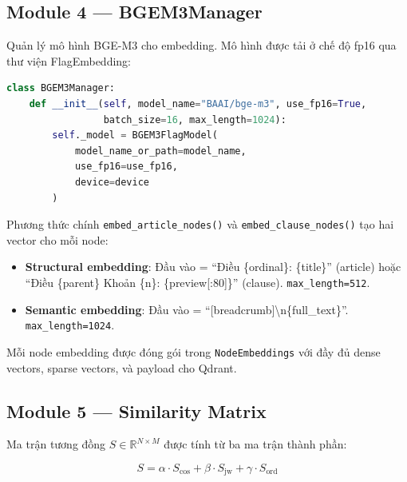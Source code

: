 \subsection{Module 4 — BGEM3Manager}

Quản lý mô hình BGE-M3 \cite{chen2024bge} cho embedding. Mô hình được tải ở chế độ \gls{fp16} qua thư viện FlagEmbedding:

\begin{lstlisting}[language=Python, caption={Khởi tạo BGE-M3 Manager với dual embedding}, label={lst:bge_m3}]
class BGEM3Manager:
    def __init__(self, model_name="BAAI/bge-m3", use_fp16=True,
                 batch_size=16, max_length=1024):
        self._model = BGEM3FlagModel(
            model_name_or_path=model_name,
            use_fp16=use_fp16,
            device=device
        )
\end{lstlisting}

Phương thức chính \texttt{embed\_article\_nodes()} và \texttt{embed\_clause\_nodes()} tạo hai vector cho mỗi node:

\begin{itemize}
    \item \textbf{Structural embedding}: Đầu vào = ``Điều \{ordinal\}: \{title\}'' (article) hoặc ``Điều \{parent\} Khoản \{n\}: \{preview[:80]\}'' (clause). \texttt{max\_length=512}.
    \item \textbf{Semantic embedding}: Đầu vào = ``[breadcrumb]\textbackslash n\{full\_text\}''. \texttt{max\_length=1024}.
\end{itemize}

Mỗi node embedding được đóng gói trong \texttt{NodeEmbeddings} với đầy đủ dense vectors, sparse vectors, và payload cho Qdrant.

\subsection{Module 5 — Similarity Matrix}

Ma trận tương đồng $S \in \mathbb{R}^{N \times M}$ được tính từ ba ma trận thành phần:

\begin{equation}
    S = \alpha \cdot S_{\text{cos}} + \beta \cdot S_{\text{jw}} + \gamma \cdot S_{\text{ord}}
    \label{eq:sim_matrix_impl}
\end{equation}

